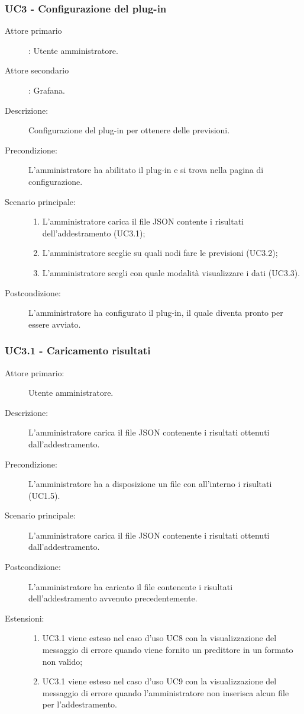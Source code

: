 \subsubsection{UC3 - Configurazione del plug-in}
\label{sssec:uc3}
\begin{description}
  \item[Attore primario]: Utente amministratore.
  \item[Attore secondario]: Grafana.
  \item[Descrizione:] Configurazione del plug-in per ottenere delle previsioni.
  \item[Precondizione:] L'amministratore ha abilitato il plug-in e si trova nella pagina di configurazione.
  \item[Scenario principale:]
  \begin{enumerate}
    \item L'amministratore carica il file JSON contente i risultati dell'addestramento (UC3.1);
    \item L'amministratore sceglie su quali nodi fare le previsioni (UC3.2);
    \item L'amministratore scegli con quale modalità visualizzare i dati (UC3.3).
  \end{enumerate}
  \item[Postcondizione:] L'amministratore ha configurato il plug-in, il quale diventa pronto per essere avviato.
\end{description}

\subsubsection{UC3.1 - Caricamento risultati}
\label{sssec:uc3.1}
\begin{description}
  \item[Attore primario:] Utente amministratore.
  \item[Descrizione:] L'amministratore carica il file JSON contenente i risultati ottenuti dall'addestramento.
  \item[Precondizione:] L'amministratore ha a disposizione un file con all'interno i risultati (UC1.5).
  \item[Scenario principale:] L'amministratore carica il file JSON contenente i risultati ottenuti dall'addestramento.
  \item[Postcondizione:] L'amministratore ha caricato il file contenente i risultati dell'addestramento avvenuto precedentemente.
  \item[Estensioni:]
  \begin{enumerate}	
	\item UC3.1 viene esteso nel caso d'uso UC8 con la visualizzazione del messaggio di errore quando viene fornito un predittore in un formato non valido;
	\item UC3.1 viene esteso nel caso d'uso UC9 con la visualizzazione del messaggio di errore quando l'amministratore non inserisca alcun file per l'addestramento.
  \end{enumerate}
\end{description}

